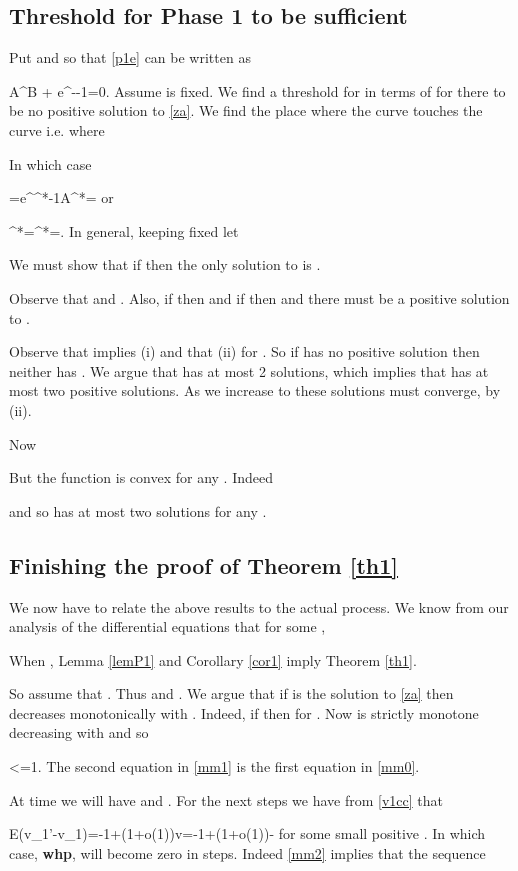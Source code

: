 \documentclass[11pt]{article}
\def\a{\alpha}
\def\e{\varepsilon}
\def\z{\zeta}
\def\whp{{\bf whp}}
\def\E{{\sf E}}
\def\vv{\vec{v}}
\newcommand{\beq}[1]{}
\begin{document}
\subsection{Threshold for Phase 1 to be sufficient}
Put  and  so that \eqref{p1e} can be written as
\beq{za}
A\z^B + e^{-\z}-1=0.
\eeq
Assume  is fixed. We find a threshold for  in terms of  for there to be no positive solution to \eqref{za}. 
We find the place  where the curve
 touches the curve  i.e. where

In which case
\beq{mm0}
\frac{\z^*}{B}=e^{\z^*}-1A^*=\frac{1-e^{-\z^*}}{(\z^*)^B}
\eeq
or
\beq{zaaz}
\z^*=\frac{e^{\z^*}-1}{d-1}\a^*=\frac{\z^*}{d(1-e^{-\z^*})^{d-1}}.
\eeq
In general, keeping  fixed let 

We must show that if  then the only solution to  is .

Observe that  and . Also, if  then  and if  then 
and there must be a positive solution to .

Observe that  implies 
(i)  and that (ii)  for . So if  has no positive solution
then neither has . We argue that  has at most 2 solutions, which implies that  has at most two 
positive solutions. As we increase  to  these solutions must converge, by (ii).

Now 

But the function  is convex for any . Indeed

and so  has at most two solutions for any .
\subsection{Finishing the proof of Theorem \ref{th1}}
We now have to relate the above results to the actual process. We know from our analysis of the differential equations that
for some ,

When , Lemma \ref{lemP1} and Corollary \ref{cor1} imply Theorem \ref{th1}.

So assume that . Thus  and .
We argue that if  is the solution to \eqref{za} then  decreases monotonically with .
Indeed, if  then  for .
Now  is strictly monotone decreasing with  and so 
\beq{mm1}
<=1.
\eeq
The second equation in \eqref{mm1} is the first equation in \eqref{mm0}.

At time  we will have  and . For the next  steps
we have from \eqref{v1cc} that
\beq{mm2}
\E(v_1'-v_1\mid \vv)=-1+(1+o(1))v=-1+(1+o(1))\leq -\e
\eeq
for some small positive . In which case, \whp,  will become zero in  steps.
Indeed \eqref{mm2} implies that the sequence
\end{document}
